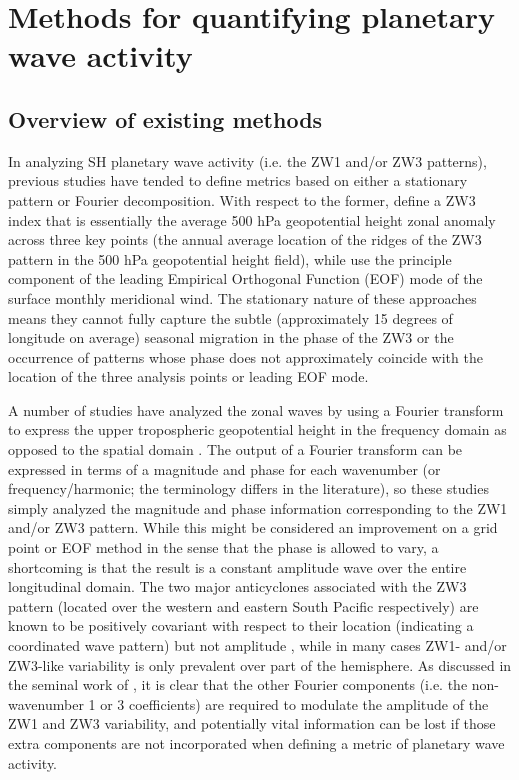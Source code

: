 \section{Methods for quantifying planetary wave activity}\label{s:methodology}

\subsection{Overview of existing methods}\label{s:existing_metrics}

In analyzing SH planetary wave activity (i.e. the ZW1 and/or ZW3 patterns), previous studies have tended to define metrics based on either a stationary pattern or Fourier decomposition. With respect to the former, \citet{Raphael2004} define a ZW3 index that is essentially the average 500 hPa geopotential height zonal anomaly across three key points (the annual average location of the ridges of the ZW3 pattern in the 500 hPa geopotential height field), while \citet{Yuan2008} use the principle component of the leading Empirical Orthogonal Function (EOF) mode of the surface monthly meridional wind. The stationary nature of these approaches means they cannot fully capture the subtle (approximately 15 degrees of longitude on average) seasonal migration in the phase of the ZW3 \citep{vanLoon1984,Mo1985} or the occurrence of patterns whose phase does not approximately coincide with the location of the three analysis points or leading EOF mode.

A number of studies have analyzed the zonal waves by using a Fourier transform to express the upper tropospheric geopotential height in the frequency domain as opposed to the spatial domain \citep{Hobbs2007,Hobbs2010,Turner2013}. The output of a Fourier transform can be expressed in terms of a magnitude and phase for each wavenumber (or frequency/harmonic; the terminology differs in the literature), so these studies simply analyzed the magnitude and phase information corresponding to the ZW1 and/or ZW3 pattern. While this might be considered an improvement on a grid point or EOF method in the sense that the phase is allowed to vary, a shortcoming is that the result is a constant amplitude wave over the entire longitudinal domain. The two major anticyclones associated with the ZW3 pattern (located over the western and eastern South Pacific respectively) are known to be positively covariant with respect to their location (indicating a coordinated wave pattern) but not amplitude \citep{Hobbs2010}, while in many cases ZW1- and/or ZW3-like variability is only prevalent over part of the hemisphere. As discussed in the seminal work of \citet{vanLoon1972}, it is clear that the other Fourier components (i.e. the non-wavenumber 1 or 3 coefficients) are required to modulate the amplitude of the ZW1 and ZW3 variability, and potentially vital information can be lost if those extra components are not incorporated when defining a metric of planetary wave activity. 

